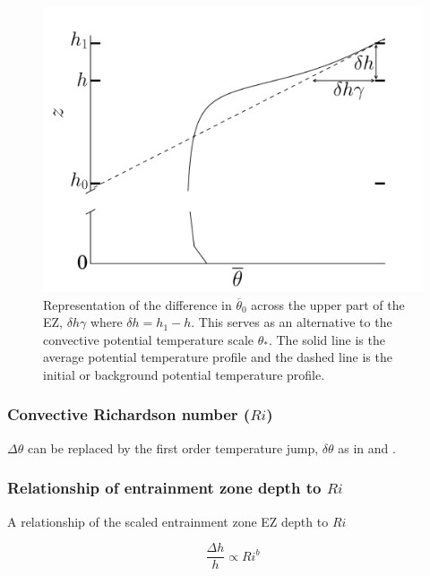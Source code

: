\documentclass[referee]{svjour3}
\begin{document}
\begin{figure}[htbp]
    \centering
    \includegraphics[scale=.32]{figures/deltah_gamma.pdf}
    \caption[Alternative Potential Temperature Scale for the EZ]{Representation of the difference in $\overline{\theta}_{0}$ across the upper part of the EZ, $\delta h \gamma$ where $\delta h = h_{1} - h$. This serves as an alternative to the convective potential temperature scale $\theta_{*}$.  The solid line is the average potential temperature profile and the dashed line is the initial or background potential temperature profile.}
    \label{fig:deltahgamma}   %
\end{figure}

\subsubsection{Convective Richardson number ($Ri$)}
\label{subsubsec:}


$\Delta \theta$ can be replaced by the first order temperature jump, $\delta \theta$ as in \cite{Fedorovich04} and \cite{Garcia14}. 

\subsubsection{Relationship of entrainment zone depth to $Ri$}

A relationship of the scaled entrainment zone EZ depth to $Ri$

\begin{equation}\label{eq:dhvsri}
\frac{\Delta h}{h} \propto Ri ^{b}
\end{equation}
\end{document}
